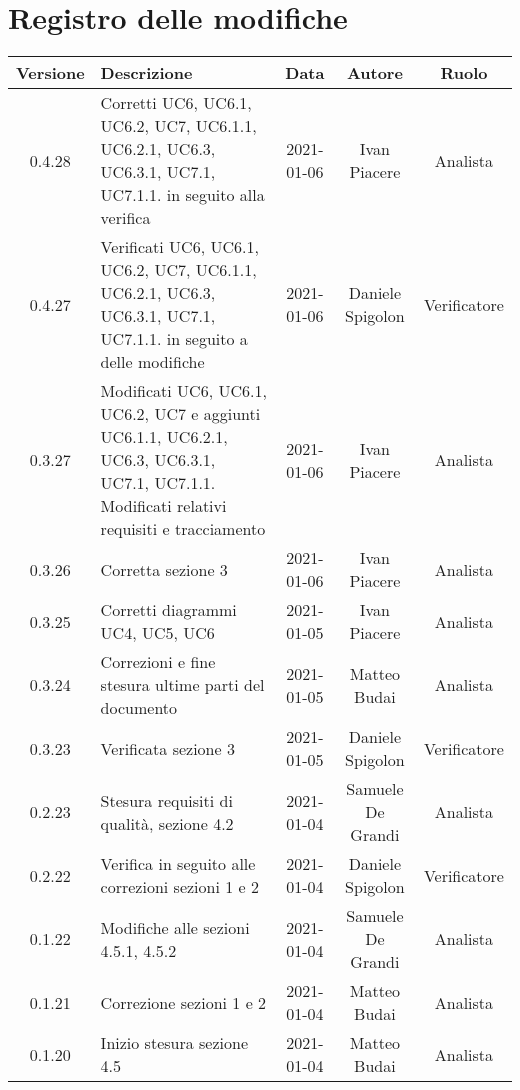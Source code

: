 \section*{Registro delle modifiche}

\begin{center}
	\begin{longtable}{|c|p{5cm}|c|c|c|}
		\hline
		\rowcolor{lighter-grayer}
		\textbf{Versione} & \textbf{Descrizione} & \textbf{Data} & \textbf{Autore} & \textbf{Ruolo} \\
		\hline
		\endfirsthead
		
		0.4.28 & Corretti UC6, UC6.1, UC6.2, UC7, UC6.1.1, UC6.2.1, UC6.3, UC6.3.1, UC7.1, UC7.1.1. in seguito alla verifica & 2021-01-06 & Ivan Piacere & Analista \\
		\hline
		0.4.27 & Verificati UC6, UC6.1, UC6.2, UC7, UC6.1.1, UC6.2.1, UC6.3, UC6.3.1, UC7.1, UC7.1.1. in seguito a delle modifiche & 2021-01-06 & Daniele Spigolon & Verificatore \\
		\hline
		0.3.27 & Modificati UC6, UC6.1, UC6.2, UC7 e aggiunti UC6.1.1, UC6.2.1, UC6.3, UC6.3.1, UC7.1, UC7.1.1. Modificati relativi requisiti e tracciamento & 2021-01-06 & Ivan Piacere & Analista \\
		\hline
		0.3.26 & Corretta sezione 3 & 2021-01-06 & Ivan Piacere & Analista \\
		\hline
		0.3.25 & Corretti diagrammi UC4, UC5, UC6 & 2021-01-05 & Ivan Piacere & Analista \\
		\hline
		0.3.24 & Correzioni e fine stesura ultime parti del documento & 2021-01-05 & Matteo Budai & Analista \\
		\hline
		0.3.23 & Verificata sezione 3 & 2021-01-05 & Daniele Spigolon & Verificatore \\
		\hline
		0.2.23 & Stesura requisiti di qualità, sezione 4.2  & 2021-01-04 & Samuele De Grandi & Analista \\
		\hline
		0.2.22 & Verifica in seguito alle correzioni sezioni 1 e 2   & 2021-01-04 & Daniele Spigolon & Verificatore \\
		\hline
		0.1.22 & Modifiche alle sezioni 4.5.1, 4.5.2   & 2021-01-04 & Samuele De Grandi & Analista \\
		\hline
		0.1.21 & Correzione sezioni 1 e 2 & 2021-01-04 & Matteo Budai & Analista \\
		\hline
		0.1.20 & Inizio stesura sezione 4.5 & 2021-01-04 & Matteo Budai & Analista \\

\end{longtable}
\end{center}
